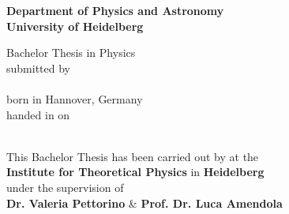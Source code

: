 \begin{titlepage}
\begin{center}
\makeatletter

\Large\textbf{Department of Physics and Astronomy\\
University of Heidelberg}

\vfill

\normalsize
Bachelor Thesis in Physics\\
\normalsize
submitted by\\[0.5cm]
\Large
\textbf{\@author}\\
\normalsize
born in Hannover, Germany\\[0.5cm]
\normalsize
handed in on\\
\Large
\textbf{\@date}\\[0.5cm]
\normalsize


\cleardoublepage
\thispagestyle{empty}


\LARGE\textbf{\@title}

\vfill

\normalsize
This Bachelor Thesis has been carried out by \@author{} at the\\
\textbf{Institute for Theoretical Physics} in \textbf{Heidelberg}\\
under the supervision of\\
\textbf{Dr. Valeria Pettorino} \& \textbf{Prof. Dr. Luca Amendola}

\makeatother
\end{center}
\end{titlepage}
